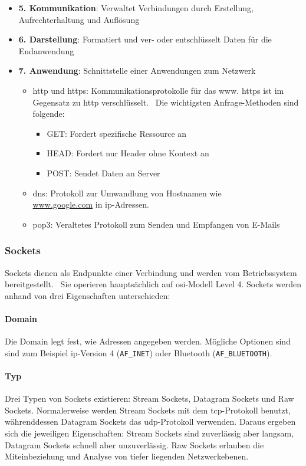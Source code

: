 \documentclass[11pt, a4paper]{article}
\begin{document}
\begin{itemize}
\begin{itemize}
	\end{itemize}
	\item \textbf{5. Kommunikation}: Verwaltet Verbindungen durch Erstellung, Aufrechterhaltung und Auflösung
	\item \textbf{6. Darstellung}: Formatiert und ver- oder entschlüsselt Daten für die Endanwendung
	\item \textbf{7. Anwendung}: Schnittstelle einer Anwendungen zum Netzwerk
	\begin{itemize}
		\item \gls{http} und \gls{https}: Kommunikationsprotokolle für das \gls{www}. \gls{https} ist im Gegensatz zu \gls{http} verschlüsselt.~\cite{HTTPWiki6:online, HTTPvers49:online} Die wichtigsten Anfrage-Methoden sind folgende:
		\begin{itemize}
			\item GET: Fordert spezifische Ressource an
			\item HEAD: Fordert nur Header ohne Kontext an
			\item POST: Sendet Daten an Server
		\end{itemize}
		\item \gls{dns}: Protokoll zur Umwandlung von Hostnamen wie \\ \url{www.google.com} in \gls{ip}-Adressen.
		\item \gls{pop3}: Veraltetes Protokoll zum Senden und Empfangen von E-Mails~\cite{Pop3microsoft:online}
	\end{itemize}
\end{itemize}

\subsubsection{Sockets}
Sockets dienen als Endpunkte einer Verbindung und werden vom Betriebssystem bereitgestellt.~\cite{SocketW33:online} Sie operieren hauptsächlich auf \gls{osi}-Modell Level 4. Sockets werden anhand von drei Eigenschaften unterschieden:
\paragraph{Domain}
Die Domain legt fest, wie Adressen angegeben werden. Mögliche Optionen sind sind zum Beispiel \gls{ip}-Version 4 (\texttt{AF\_INET}) oder Bluetooth (\texttt{AF\_BLUETOOTH}).
\paragraph{Typ}
Drei Typen von Sockets existieren: Stream Sockets, Datagram Sockets und Raw Sockets. Normalerweise werden Stream Sockets mit dem \gls{tcp}-Protokoll benutzt, währenddessen Datagram Sockets das \gls{udp}-Protokoll verwenden. Daraus ergeben sich die jeweiligen Eigenschaften: Stream Sockets sind zuverlässig aber langsam, Datagram Sockets schnell aber unzuverlässig. Raw Sockets erlauben die Miteinbeziehung und Analyse von tiefer liegenden Netzwerkebenen. 
\end{document}
